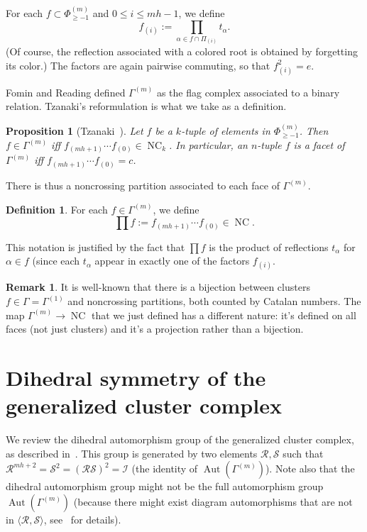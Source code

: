 \documentclass[11pt]{article}
\newtheorem{prop}[theo]{Proposition}
\theoremstyle{definition}
\newtheorem{defi}[theo]{Definition}
\newtheorem{rema}[theo]{Remark}
\DeclareMathOperator{\Aut}{Aut}
\newcommand{\RR}{\mathcal{R}}
\renewcommand{\SS}{\mathcal{S}}
\newcommand{\II}{\mathcal{I}}
\DeclareMathOperator{\NC}{NC}
\begin{document}
For each $f\subset \Phi^{(m)}_{\geq -1}$ and $0\leq i \leq mh-1$, we define
\[ 
    f_{(i)} := \prod_{\alpha \in f \cap \varPi_{(i)} } t_\alpha.
\]
(Of course, the reflection associated with a colored root is obtained by forgetting its color.)  The factors are again pairwise commuting, so that $f_{(i)}^2 = e$. %

Fomin and Reading defined $\Gamma^{(m)}$ as the flag complex associated to a binary relation.  Tzanaki's reformulation is what we take as a definition.

\begin{prop}[Tzanaki~\cite{tzanaki}] \label{prop:tzanaki}
Let $f$ be a $k$-tuple of elements in $\Phi^{(m)}_{\geq -1}$.  Then $f\in \Gamma^{(m)}$ iff $f_{(mh+1)} \cdots f_{(0)} \in \NC_k$.  In particular, an $n$-tuple $f$ is a facet of $\Gamma^{(m)}$ iff $f_{(mh+1)} \cdots f_{(0)} = c$.
\end{prop}

There is thus a noncrossing partition associated to each face of $\Gamma^{(m)}$.

\begin{defi}
    For each $f\in \Gamma^{(m)}$, we define
    \[
        \textstyle\prod f := f_{(mh+1)} \cdots f_{(0)} \in \NC.
    \]
\end{defi}

This notation is justified by the fact that $\prod f$ is the product of reflections $t_\alpha$ for $\alpha \in f$ (since each $t_\alpha$ appear in exactly one of the factors $f_{(i)}$.

\begin{rema}
    It is well-known that there is a bijection between clusters $f\in\Gamma=\Gamma^{(1)}$ and noncrossing partitions, both counted by Catalan numbers.  The map $\Gamma^{(m)} \to \NC$ that we just defined has a different nature: it's defined on all faces (not just clusters) and it's a projection rather than a bijection.  
\end{rema}

\section{Dihedral symmetry of the generalized cluster complex}
\label{sec:dihedralcluster}


We review the dihedral automorphism group of the generalized cluster complex, as described in~\cite{josuatverges}.  This group is generated by two elements $\RR, \SS$ such that $\RR^{mh+2} = \SS^2 = (\RR\SS)^2 = \II$ (the identity of $\Aut(\Gamma^{(m)})$).  Note also that the dihedral automorphism group might not be the full automorphism group $\Aut(\Gamma^{(m)})$ (because there might exist diagram automorphisms that are not in $\langle \RR ,\SS \rangle$, see~\cite{josuatverges} for details). 
\end{document}
